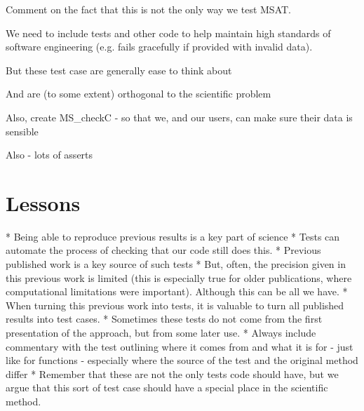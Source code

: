 \documentclass[11pt, oneside]{article}   	%
\begin{document}
Comment on the fact that this is not the only way we test MSAT.

We need to include tests and other code to help maintain high 
standards of software engineering (e.g. fails gracefully if provided 
with invalid data).

But these test case are generally ease to think about

And are (to some extent) orthogonal to the scientific problem

Also, create MS\_checkC - so that we, and our users, can make sure 
their data is sensible

Also - lots of asserts

\section{Lessons}

* Being able to reproduce previous results is a key part of science
* Tests can automate the process of checking that our code still does 
this.
* Previous published work is a key source of such tests
* But, often, the precision given in this previous work is limited (this
is especially true for older publications, where computational limitations 
were important). Although this can be all we have.
* When turning this previous work into tests, it is valuable to turn all
published results into test cases.
* Sometimes these tests do not come from the first presentation of the 
approach, but from some later use.
* Always include commentary with the test outlining where it comes from
and what it is for - just like for functions - especially where the source of the 
test and the original method differ
* Remember that these are not the only tests code should have, but we
argue that this sort of test case should have a special place in the scientific
method.


 
\end{document}
